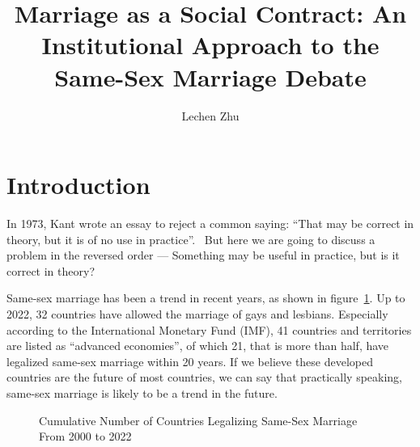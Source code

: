 \documentclass[man,floatsintext]{apa7}
\title{Marriage as a Social Contract: An Institutional Approach to the Same-Sex Marriage Debate}
\author{Lechen Zhu}
\affiliation{}
\begin{document}
\maketitle{}
\tableofcontents

\newpage

\section{Introduction}
In 1973, Kant wrote an essay to reject a common saying: ``That may be correct in theory, but it is of no use in practice''.~\autocite{kantCommonSayingThat2009} But here we are going to discuss a problem in the reversed order --- Something may be useful in practice, but is it correct in theory? 

Same-sex marriage has been a trend in recent years, as shown in figure~\ref{Cumu}. Up to 2022, 32 countries have allowed the marriage of gays and lesbians. Especially according to the International Monetary Fund (IMF), 41 countries and territories are listed as ``advanced economies'', of which 21, that is more than half, have legalized same-sex marriage within 20 years. If we believe these developed countries are the future of most countries, we can say that practically speaking, same-sex marriage is likely to be a trend in the future.


\begin{figure}[H]
    \centering
        
    \caption{Cumulative Number of Countries Legalizing Same-Sex Marriage From 2000 to 2022~\autocite{perper32CountriesWorld2022}}
    \label{Cumu}
\end{figure}
    
\end{document}
